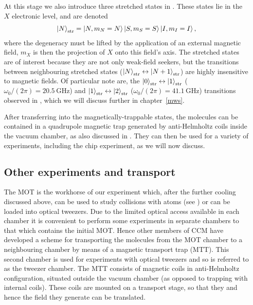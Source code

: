 At this stage we also introduce three stretched states in \CaF{}. These states
lie in the $X$ electronic level, and are denoted
%
\begin{equation}
  \ket{N}_\text{str} = \ket{N, m_N=N}\ket{S, m_S=S}\ket{I,m_I=I},
  \label{theory:eqn:stretched}
\end{equation}
%
where the degeneracy must be lifted by the application of an external magnetic
field, $m_X$ is then the projection of $X$ onto this field's axis. The
stretched states are of interest because they are not only weak-field seekers,
but the transitions between neighbouring stretched states
($\ket{N}_\text{str}\leftrightarrow\ket{N+1}_\text{str}$) are highly
insensitive to magnetic fields. Of particular note are, the
$\ket{0}_\text{str}\leftrightarrow\ket{1}_\text{str}$ ($\omega_0/(2\pi) =
\SI{20.5}{\giga\hertz}$) and
$\ket{1}_\text{str}\leftrightarrow\ket{2}_\text{str}$ ($\omega_0/(2\pi) =
\SI{41.1}{\giga\hertz}$) transitions observed in
, which we will discuss further in
chapter~\ref{mws}.

After transferring into the magnetically-trappable states, the molecules can be
contained in a quadrupole magnetic trap generated by anti-Helmholtz coils
inside the vacuum chamber, as also discussed in
. They can then be used for a variety of
experiments, including the chip experiment, as we will now discuss.

\subsection{Other experiments and transport}

The \CaF{} MOT is the workhorse of our experiment which, after the further
cooling discussed above, can be used to study collisions with \Rb{} atoms (see
) or can be
loaded into optical tweezers. Due to the limited optical access available in
each chamber it is convenient to perform some experiments in separate chambers
to that which contains the initial MOT. Hence other members of CCM have
developed a scheme for transporting the molecules from the MOT chamber to a
neighbouring chamber by means of a magnetic transport trap (MTT). This second
chamber is used for experiments with optical tweezers and so is referred to as
the tweezer chamber. The MTT consists of magnetic coils in anti-Helmholtz
configuration, situated outside the vacuum chamber (as opposed to trapping with
internal coils). These coils are mounted on a transport stage, so that they and
hence the field they generate can be translated.

